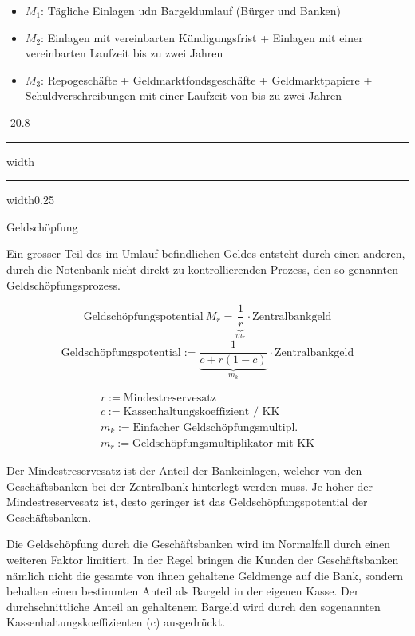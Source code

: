\documentclass[9pt, landscape, fleqn]{scrartcl}
\makeatletter
\renewcommand{\subsection}{\@startsection{subsection}{1}{0mm}%
{-2\baselineskip}{0.8\baselineskip}%
{\hrule depth 0.2pt width\columnwidth\hrule depth0.75pt
width0.25\columnwidth\vspace*{1.2em}\large\bfseries\rmfamily}}
\makeatother
\begin{document}
\begin{multicols*}{3}
\begin{itemize}
    \item $M_1$: Tägliche Einlagen udn Bargeldumlauf (Bürger und Banken)
    \item $M_2$: Einlagen mit vereinbarten Kündigungsfrist + Einlagen mit einer vereinbarten Laufzeit bis zu zwei Jahren 
    \item $M_3$: Repogeschäfte + Geldmarktfondsgeschäfte + Geldmarktpapiere + Schuldverschreibungen mit einer Laufzeit von bis zu zwei Jahren 
\end{itemize}

\subsection{Geldschöpfung}

Ein grosser Teil des im Umlauf befindlichen Geldes entsteht durch einen anderen, durch die Notenbank nicht direkt zu kontrollierenden Prozess, den so genannten Geldschöpfungsprozess.

\begin{equation}
   \text{Geldschöpfungspotential}~ M_r = \underbrace{\frac{1}{r}}_{m_r}\cdot \text {Zentralbankgeld}
\end{equation}
\begin{equation}
    \text{Geldschöpfungspotential}:= \underbrace{\frac{1}{c+r(1-c)}}_{m_k}\cdot \text {Zentralbankgeld}
\end{equation}   

\begin{align}
    r := \text{Mindestreservesatz} \\
    c := \text{Kassenhaltungskoeffizient / KK} \\
    m_k := \text{Einfacher Geldschöpfungsmultipl.} \\
    m_r := \text{Geldschöpfungsmultiplikator mit KK} 
\end{align}

Der Mindestreservesatz ist der Anteil der Bankeinlagen, welcher von den Geschäftsbanken bei der Zentralbank hinterlegt werden muss. Je höher der Mindestreservesatz ist, desto geringer ist das Geldschöpfungspotential der Geschäftsbanken. \newline 

Die Geldschöpfung durch die Geschäftsbanken wird im Normalfall durch einen weiteren Faktor limitiert. In der Regel bringen die Kunden der Geschäftsbanken nämlich nicht die gesamte von ihnen gehaltene Geldmenge auf die Bank, sondern behalten einen bestimmten Anteil als Bargeld in der eigenen Kasse. Der durchschnittliche Anteil an gehaltenem Bargeld wird durch den sogenannten Kassenhaltungskoeffizienten (c) ausgedrückt.


\end{multicols*}
\end{document}
